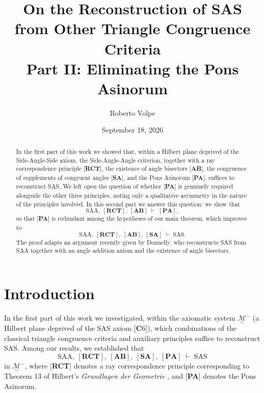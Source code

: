 \documentclass[11pt,a4paper]{article}
\title{On the Reconstruction of SAS from Other Triangle Congruence Criteria \\
\large Part II: Eliminating the Pons Asinorum}
\author{Roberto Volpe}
\date{September 18, 2026}
\theoremstyle{definition}
\theoremstyle{remark}
\numberwithin{equation}{section}
\newcommand{\MG}{\underset{\sim}{\mathcal{M}}}
\begin{document}
\maketitle

\begin{abstract}
In the first part of this work we showed that, within a Hilbert plane deprived of the
Side-Angle-Side axiom, the Side-Angle-Angle criterion, together with a ray
correspondence principle [\textbf{RCT}], the existence of angle bisectors [\textbf{AB}], the
congruence of supplements of congruent angles [\textbf{SA}], and the Pons Asinorum
[\textbf{PA}], suffices to reconstruct SAS. We left open the question of whether
[\textbf{PA}] is genuinely required alongside the other three principles, noting only a
qualitative asymmetry in the nature of the principles involved. In this second part we
answer this question: we show that
\begin{equation*}
\textrm{SAA},\ [\textbf{RCT}],\ [\textbf{AB}] \;\vdash\; [\textbf{PA}],
\end{equation*}
so that [\textbf{PA}] is redundant among the hypotheses of our main theorem,
which improves to
\begin{equation*}
\textrm{SAA},\ [\textbf{RCT}],\ [\textbf{AB}],\ [\textbf{SA}] \;\vdash\; \textrm{SAS}.
\end{equation*}
The proof adapts an argument recently given by Donnelly, who reconstructs SAS from SAA
together with an angle addition axiom and the existence of angle bisectors.
\end{abstract}

\section{Introduction}\label{PEN2_s1}

In the first part of this work \cite{Volpe2026I} we investigated, within the axiomatic
system $\MG^{-}$ (a Hilbert plane deprived of the SAS axiom [\textbf{C}6]), which combinations of
the classical triangle congruence criteria and auxiliary principles suffice to reconstruct
SAS. Among our results, we established that
\begin{equation}\label{PEN2_ESAA_OLD}
\textrm{SAA},\ [\textbf{RCT}],\ [\textbf{AB}],\ [\textbf{SA}],\ [\textbf{PA}] \;\vdash\; \textrm{SAS}
\end{equation}
in $\MG^{-}$, where [\textbf{RCT}] denotes a ray correspondence principle corresponding to
Theorem 13 of Hilbert's \emph{Grundlagen der Geometrie} \cite{Hilbert1950}, and [\textbf{PA}] denotes the Pons
Asinorum.
\end{document}
